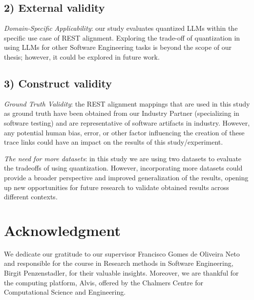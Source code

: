 \documentclass[conference]{IEEEtran}
\begin{document}
\subsection*{\textbf{2) External validity}}
    
    \textit{Domain-Specific Applicability}: our study evaluates quantized LLMs within the specific use case of REST alignment. Exploring the trade-off of quantization in using LLMs for other Software Engineering tasks is beyond the scope of our thesis; however, it could be explored in future work.

\subsection*{\textbf{3) Construct validity}}

\textit{Ground Truth Validity}: the REST alignment mappings that are used in this study as ground truth have been obtained from our Industry Partner (specializing in software testing) and are representative of software artifacts in industry. However, any potential human bias, error, or other factor influencing the creation of these trace links could have an impact on the results of this study/experiment.

\textit{The need for more datasets}: in this study we are using two datasets to evaluate the tradeoffs of using quantization. However, incorporating more datasets could provide a broader perspective and improved generalization of the results, opening up new opportunities for future research to validate obtained results across different contexts.

\section*{Acknowledgment}
We dedicate our gratitude to our supervisor Francisco Gomes de Oliveira Neto and responsible for the course in Research methods in Software Engineering, Birgit Penzenstadler, for their valuable insights. Moreover, we are thankful for the computing platform, Alvis, offered by the Chalmers Centre for Computational Science and Engineering.
\end{document}
